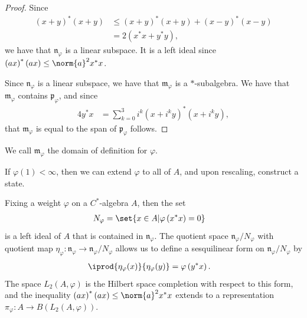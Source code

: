 \documentclass[10pt]{mypackage}
\begin{document}
\begin{proof}
  Since
  \begin{align*}
    \left( x + y \right)^{\ast}\left( x + y \right) &\leq \left( x + y \right)^{\ast}\left( x + y \right) + \left( x-y \right)^{\ast}\left( x-y \right)\\
                                                    &= 2\left( x^{\ast}x + y^{\ast}y \right),
  \end{align*}
  we have that $\mathfrak{n}_{\varphi}$ is a linear subspace. It is a left ideal since $\left( ax \right)^{\ast}\left( ax \right) \leq \norm{a}^2x^{\ast}x$.

  Since $\mathfrak{n}_{\varphi}$ is a linear subspace, we have that $\mathfrak{m}_{\varphi}$ is a $\ast$-subalgebra. We have that $\mathfrak{m}_{\varphi}$ contains $\mathfrak{p}_{\varphi}$, and since
  \begin{align*}
    4y^{\ast}x &= \sum_{k=0}^{3}i^{k}\left( x + i^{k}y \right)^{\ast}\left( x + i^{k}y \right),
  \end{align*}
  that $\mathfrak{m}_{\varphi}$ is equal to the span of $\mathfrak{p}_{\varphi}$ follows.
\end{proof}
We call $\mathfrak{m}_{\varphi}$ the domain of definition for $\varphi$.

If $\varphi\left( 1 \right) < \infty$, then we can extend $\varphi$ to all of $A$, and upon rescaling, construct a state.

Fixing a weight $\varphi$ on a $C^{\ast}$-algebra $A$, then the set
\begin{align*}
  N_{\varphi} &= \set{x\in A | \varphi\left( x^{\ast}x \right) = 0}
\end{align*}
is a left ideal of $A$ that is contained in $\mathfrak{n}_{\varphi}$. The quotient space $\mathfrak{n}_{\varphi}/N_{\varphi}$ with quotient map $\eta_{\varphi}\colon \mathfrak{n}_{\varphi}\rightarrow \mathfrak{n}_{\varphi}/N_{\varphi}$ allows us to define a sesquilinear form on $\mathfrak{n}_{\varphi}/N_{\varphi}$ by
\begin{align*}
  \iprod{\eta_{\varphi}(x)}{\eta_{\varphi}(y)} &= \varphi\left( y^{\ast}x \right).
\end{align*}
The space $L_2\left( A,\varphi \right)$ is the Hilbert space completion with respect to this form, and the inequality $\left( ax \right)^{\ast}\left( ax \right)\leq \norm{a}^{2}x^{\ast}x$ extends to a representation $\pi_{\varphi}\colon A\rightarrow B\left( L_2\left( A,\varphi \right) \right)$.
\end{document}
